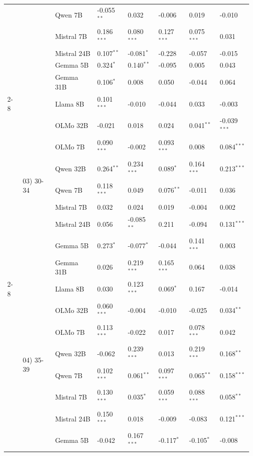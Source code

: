 \begin{longtable}[t]{llllllll}
 &  & Qwen 7B & -0.055$^{**}$ & 0.032 & -0.006 & 0.019 & -0.010 \\
 &  & Mistral 7B & 0.186$^{***}$ & 0.080$^{***}$ & 0.127$^{***}$ & 0.075$^{***}$ & 0.031 \\
 &  & Mistral 24B & 0.107$^{**}$ & -0.081$^{*}$ & -0.228 & -0.057 & -0.015 \\
 &  & Gemma 5B & 0.324$^{*}$ & 0.140$^{**}$ & -0.095 & 0.005 & 0.043 \\
 &  & Gemma 31B & 0.106$^{*}$ & 0.008 & 0.050 & -0.044 & 0.064 \\
\cline{2-8}
 & \multirow[t]{9}{*}{03) 30-34} & Llama 8B & 0.101$^{***}$ & -0.010 & -0.044 & 0.033 & -0.003 \\
 &  & OLMo 32B & -0.021 & 0.018 & 0.024 & 0.041$^{**}$ & -0.039$^{***}$ \\
 &  & OLMo 7B & 0.090$^{***}$ & -0.002 & 0.093$^{***}$ & 0.008 & 0.084$^{***}$ \\
 &  & Qwen 32B & 0.264$^{**}$ & 0.234$^{***}$ & 0.089$^{*}$ & 0.164$^{***}$ & 0.213$^{***}$ \\
 &  & Qwen 7B & 0.118$^{***}$ & 0.049 & 0.076$^{**}$ & -0.011 & 0.036 \\
 &  & Mistral 7B & 0.032 & 0.024 & 0.019 & -0.004 & 0.002 \\
 &  & Mistral 24B & 0.056 & -0.085$^{**}$ & 0.211 & -0.094 & 0.131$^{***}$ \\
 &  & Gemma 5B & 0.273$^{*}$ & -0.077$^{*}$ & -0.044 & 0.141$^{***}$ & 0.003 \\
 &  & Gemma 31B & 0.026 & 0.219$^{***}$ & 0.165$^{***}$ & 0.064 & 0.038 \\
\cline{2-8}
 & \multirow[t]{9}{*}{04) 35-39} & Llama 8B & 0.030 & 0.123$^{***}$ & 0.069$^{*}$ & 0.167 & -0.014 \\
 &  & OLMo 32B & 0.060$^{***}$ & -0.004 & -0.010 & -0.025 & 0.034$^{**}$ \\
 &  & OLMo 7B & 0.113$^{***}$ & -0.022 & 0.017 & 0.078$^{***}$ & 0.042 \\
 &  & Qwen 32B & -0.062 & 0.239$^{***}$ & 0.013 & 0.219$^{***}$ & 0.168$^{**}$ \\
 &  & Qwen 7B & 0.102$^{***}$ & 0.061$^{**}$ & 0.097$^{***}$ & 0.065$^{**}$ & 0.158$^{***}$ \\
 &  & Mistral 7B & 0.130$^{***}$ & 0.035$^{*}$ & 0.059$^{***}$ & 0.088$^{***}$ & 0.058$^{**}$ \\
 &  & Mistral 24B & 0.150$^{***}$ & 0.018 & -0.009 & -0.083 & 0.121$^{***}$ \\
 &  & Gemma 5B & -0.042 & 0.167$^{***}$ & -0.117$^{*}$ & -0.105$^{*}$ & -0.008 \\

\end{longtable}
